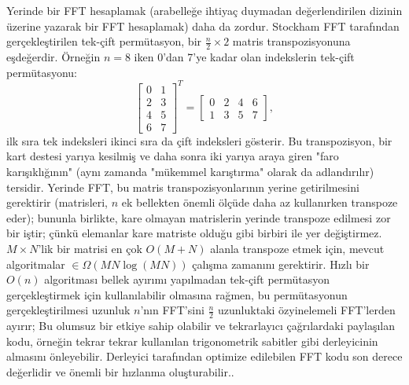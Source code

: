 \documentclass[10pt]{article}
\begin{document}
Yerinde bir FFT hesaplamak (arabelle\u{g}e ihtiya\c{c} duymadan
de\u{g}erlendirilen dizinin \"{u}zerine yazarak bir FFT hesaplamak) daha da 
zordur. Stockham FFT taraf{\i}ndan ger\c{c}ekle\c{s}tirilen tek-\c{c}ift perm\"{u}tasyon, 
bir $\frac{n}{2} \times 2$ matris transpozisyonuna e\c{s}de\u{g}erdir.
\"{O}rne\u{g}in $n=8$ iken 0'dan 7'ye kadar olan indekslerin tek-\c{c}ift
perm\"{u}tasyonu:
\[ 
\left[
  \begin{matrix}
    0 & 1\\
    2 & 3\\
    4 & 5\\
    6 & 7
  \end{matrix}
\right]^T = 
\left[
  \begin{matrix}
    0 & 2 & 4 & 6\\
    1 & 3 & 5 & 7
  \end{matrix}
\right],
\]
ilk s{\i}ra tek indeksleri ikinci s{\i}ra da \c{c}ift indeksleri g\"{o}sterir.
Bu transpozisyon, bir kart destesi yar{\i}ya kesilmi\c{s} ve daha sonra iki
yar{\i}ya araya giren "faro kar{\i}\c{s}{\i}kl{\i}\u{g}{\i}n{\i}n" (ayn{\i} zamanda 
"m\"{u}kemmel kar{\i}\c{s}t{\i}rma" olarak da adland{\i}r{\i}l{\i}r) 
tersidir\cite{sedgewick:algorithms}. Yerinde FFT, bu matris transpozisyonlar{\i}n{\i}n
yerine getirilmesini gerektirir (matrisleri, $n$ ek bellekten \"{o}nemli \"{o}l\c{c}\"{u}de
daha az kullan{\i}rken transpoze eder); bununla birlikte, kare olmayan matrislerin
yerinde transpoze edilmesi zor bir i\c{s}tir; \c{c}\"{u}nk\"{u} elemanlar kare matriste oldu\u{g}u
gibi birbiri ile yer de\u{g}i\c{s}tirmez. $M \times N$'lik bir matrisi en \c{c}ok $O(M + N)$
alanla transpoze etmek i\c{c}in, mevcut algoritmalar $\in \Omega(M N \log(M N))$ \c{c}al{\i}\c{s}ma
zaman{\i}n{\i} gerektirir\cite{fich:permuting}. H{\i}zl{\i} bir $O(n)$ algoritmas{\i} bellek 
ay{\i}r{\i}m{\i} yap{\i}lmadan tek-\c{c}ift perm\"{u}tasyon ger\c{c}ekle\c{s}tirmek i\c{c}in kullan{\i}labilir
olmas{\i}na ra\u{g}men, bu perm\"{u}tasyonun ger\c{c}ekle\c{s}tirilmesi uzunluk $n$'n{\i}n FFT'sini
$\frac{n}{2}$ uzunluktaki \"{o}zyinelemeli FFT'lerden ay{\i}r{\i}r; Bu olumsuz bir 
etkiye sahip olabilir ve tekrarlay{\i}c{\i} \c{c}a\u{g}r{\i}lardaki payla\c{s}{\i}lan kodu, \"{o}rne\u{g}in
tekrar tekrar kullan{\i}lan trigonometrik sabitler gibi derleyicinin almas{\i}n{\i} 
\"{o}nleyebilir. Derleyici taraf{\i}ndan optimize edilebilen FFT kodu son derece 
de\u{g}erlidir ve \"{o}nemli bir h{\i}zlanma olu\c{s}turabilir.\cite{myrnyy:simple}.
\end{document}

